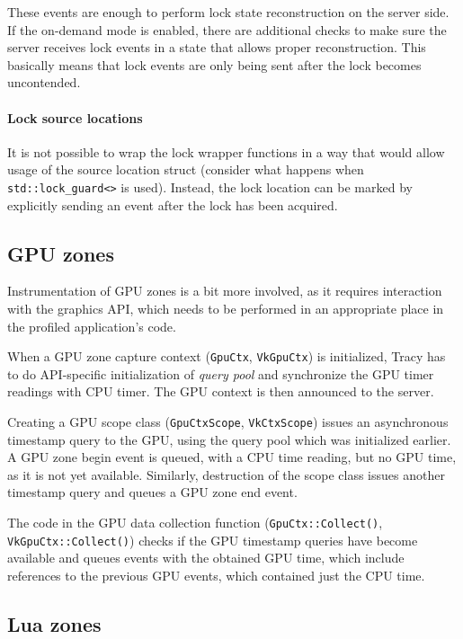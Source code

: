 \documentclass[hidelinks,titlepage,a4paper]{article}
\begin{document}
These events are enough to perform lock state reconstruction on the server side. If the on-demand mode is enabled, there are additional checks to make sure the server receives lock events in a state that allows proper reconstruction. This basically means that lock events are only being sent after the lock becomes uncontended.

\paragraph{Lock source locations}

It is not possible to wrap the lock wrapper functions in a way that would allow usage of the source location struct (consider what happens when \texttt{std::lock\_guard<>} is used). Instead, the lock location can be marked by explicitly sending an event after the lock has been acquired.

\subsection{GPU zones}

Instrumentation of GPU zones is a bit more involved, as it requires interaction with the graphics API, which needs to be performed in an appropriate place in the profiled application's code.

When a GPU zone capture context (\texttt{GpuCtx}, \texttt{VkGpuCtx}) is initialized, Tracy has to do API-specific initialization of \emph{query pool} and synchronize the GPU timer readings with CPU timer. The GPU context is then announced to the server.

Creating a GPU scope class (\texttt{GpuCtxScope}, \texttt{VkCtxScope}) issues an asynchronous timestamp query to the GPU, using the query pool which was initialized earlier. A GPU zone begin event is queued, with a CPU time reading, but no GPU time, as it is not yet available. Similarly, destruction of the scope class issues another timestamp query and queues a GPU zone end event.

The code in the GPU data collection function (\texttt{GpuCtx::Collect()}, \texttt{VkGpuCtx::Collect()}) checks if the GPU timestamp queries have become available and queues events with the obtained GPU time, which include references to the previous GPU events, which contained just the CPU time.

\subsection{Lua zones}
\end{document}
